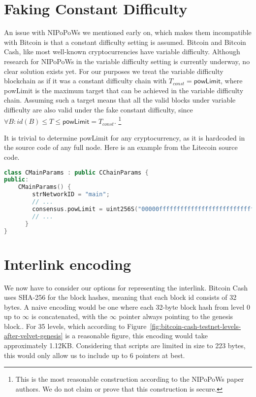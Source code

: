 \section{Faking Constant Difficulty}
An issue with NIPoPoWs we mentioned early on, which makes them incompatible with Bitcoin is that a constant difficulty setting is assumed.  Bitcoin and Bitcoin Cash, like most well-known cryptocurrencies have variable difficulty. Although research for NIPoPoWs in the variable difficulty setting is currently underway, no clear solution exists yet. For our purposes we treat the variable difficulty blockchain as if it was a constant difficulty chain with $T_{const}=\mathsf{powLimit}$, where {\sf powLimit} is the maximum target that can be achieved in the variable difficulty chain. Assuming such a target means that all the valid blocks under variable difficulty are also valid under the fake constant difficulty, since $\forall B: id(B) \le T \le \mathsf{powLimit} = T_{const}$. \footnote{This is the most reasonable construction according to the NIPoPoWs paper authors. We do not claim or prove that this construction is secure.}

It is trivial to determine {\sf powLimit} for any cryptocurrency, as it is hardcoded in the source code of any full node. Here is an example from the Litecoin source code.

\begin{lstlisting}[language=C++]
class CMainParams : public CChainParams {
public:
    CMainParams() {
        strNetworkID = "main";
        // ...
        consensus.powLimit = uint256S("00000fffffffffffffffffffffffffffffffffffffffffffffffffffffffffff"); 
        // ...
      }
}
\end{lstlisting}

\section{Interlink encoding}
We now have to consider our options for representing the interlink. 
Bitcoin Cash uses SHA-256 for the block hashes, meaning that each block id consists of 32 bytes. 
A naive encoding would be one where each 32-byte block hash from level $0$ up to $\infty$ is concatenated, with the $\infty$ pointer always pointing to the genesis block..
For 35 levels, which according to Figure~\ref{fig:bitcoin-cash-testnet-levels-after-velvet-genesis} is a reasonable figure, this encoding would take approximately 1.12KB.
Considering that  scripts are limited in size to 223 bytes, this would only allow us to include up to 6 pointers at best.

